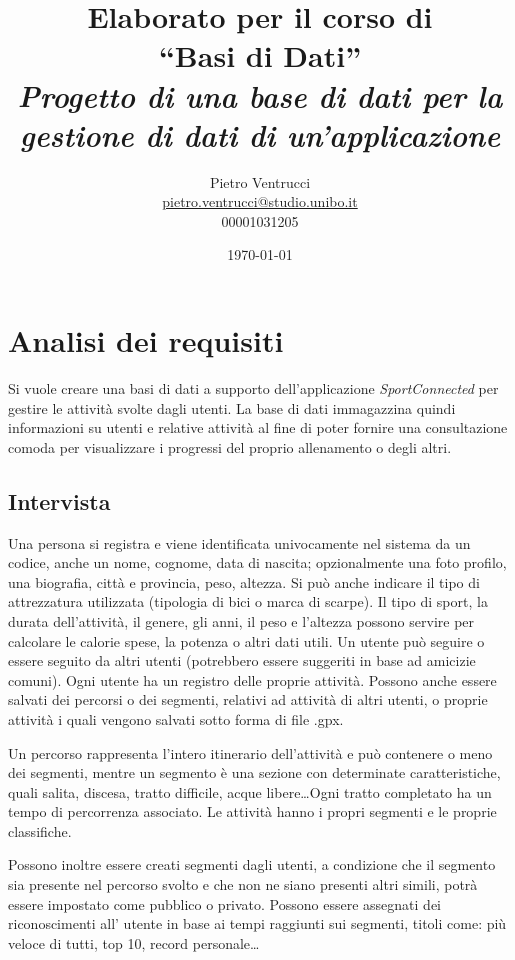 \documentclass[12pt]{report}
\title{Elaborato per il corso di\\``Basi di Dati''\\[0.3in]
	\large \it Progetto di una base di dati per la gestione di dati di un'applicazione
}
\author{Pietro Ventrucci\\\href{mailto:pietro.ventrucci@studio.unibo.it}{pietro.ventrucci@studio.unibo.it}\\00001031205}
\date{\today}
\begin{document}
\maketitle

\tableofcontents

\chapter{Analisi dei requisiti}

Si vuole creare una basi di dati a supporto dell'applicazione \emph{SportConnected} per gestire le attività
svolte dagli utenti. La base di dati immagazzina quindi informazioni su utenti e relative attività al fine
di poter fornire una consultazione comoda per visualizzare i progressi del proprio allenamento o degli altri.

\section{Intervista}
Una persona si registra e viene identificata univocamente nel sistema da un codice, anche un nome, cognome, 
data di nascita; opzionalmente una foto profilo, una biografia, città e provincia, peso, altezza. 
Si può anche indicare il tipo di attrezzatura utilizzata (tipologia di bici o marca di scarpe).
Il tipo di sport, la durata dell'attività, il genere, gli anni, il peso e l'altezza possono servire per
calcolare le calorie spese, la potenza o altri dati utili. Un utente può seguire o essere seguito da altri 
utenti (potrebbero essere suggeriti in base ad amicizie comuni). Ogni utente ha un registro delle proprie 
attività. Possono anche essere salvati dei percorsi o dei segmenti, relativi ad attività di altri utenti, 
o proprie attività i quali vengono salvati sotto forma di file .gpx.

Un percorso rappresenta l'intero itinerario dell'attività e può contenere o meno dei segmenti, mentre un 
segmento è una sezione con determinate caratteristiche, quali salita, discesa, tratto difficile, 
acque libere\dots Ogni tratto completato ha un tempo di percorrenza associato. Le attività hanno i 
propri segmenti e le proprie classifiche.

Possono inoltre essere creati segmenti dagli utenti, a condizione che 
il segmento sia presente nel percorso svolto e che non ne siano presenti altri simili, potrà essere 
impostato come pubblico o privato. Possono essere assegnati dei riconoscimenti all' utente in base ai 
tempi raggiunti sui segmenti, titoli come: più veloce di tutti, top 10, record personale\dots
\end{document}
